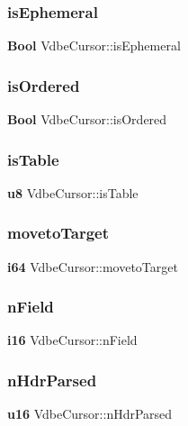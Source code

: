 \mbox{\label{struct_vdbe_cursor_ac13d003d1cf017f3e44897de29a7c2cb}} 
\subsubsection{isEphemeral}
{\footnotesize\ttfamily \textbf{ Bool} Vdbe\+Cursor\+::is\+Ephemeral}

\mbox{\label{struct_vdbe_cursor_a8d9e802372b801c4eb5aef6340cfa21a}} 
\subsubsection{isOrdered}
{\footnotesize\ttfamily \textbf{ Bool} Vdbe\+Cursor\+::is\+Ordered}

\mbox{\label{struct_vdbe_cursor_ab6c2642afb560159a06cffbe7aa98619}} 
\subsubsection{isTable}
{\footnotesize\ttfamily \textbf{ u8} Vdbe\+Cursor\+::is\+Table}

\mbox{\label{struct_vdbe_cursor_af3c157d480c0597ba50aca227eb8e3b8}} 
\subsubsection{movetoTarget}
{\footnotesize\ttfamily \textbf{ i64} Vdbe\+Cursor\+::moveto\+Target}

\mbox{\label{struct_vdbe_cursor_a2c903d08588ce7ade6ca4f678bd83bbb}} 
\subsubsection{nField}
{\footnotesize\ttfamily \textbf{ i16} Vdbe\+Cursor\+::n\+Field}

\mbox{\label{struct_vdbe_cursor_a3e0ed59c6fd714032e665a6249087924}} 
\subsubsection{nHdrParsed}
{\footnotesize\ttfamily \textbf{ u16} Vdbe\+Cursor\+::n\+Hdr\+Parsed}

